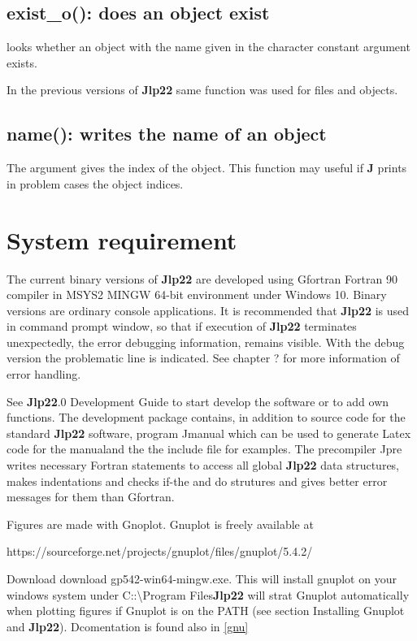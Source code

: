 \subsection{\textcolor{VioletRed}{exist\_o}(): does an object exist}
\label{existo}
looks whether an object with the name given in
the character constant  argument exists.
\begin{note}
In the previous versions of \textbf{Jlp22} same function was used for files and objects.
\end{note}
\subsection{\textcolor{VioletRed}{name}(): writes the name of an object}
\label{name}
The argument gives the index of the object. This function
may useful if \textbf{J} prints in problem cases the object indices.
\section{System requirement}
\label{system}
The current binary versions of \textbf{Jlp22} are developed using Gfortran Fortran 90 compiler in MSYS2 MINGW 64-bit environment
under Windows 10.
Binary versions are ordinary console applications. It is recommended that \textbf{Jlp22} is used in command
prompt window, so that
if execution of \textbf{Jlp22} terminates unexpectedly, the error debugging information, remains visible.
With the debug version the problematic line is indicated.
See chapter ? for more information of error handling.

See \textbf{Jlp22}.0 Development Guide to start develop the software or to add
own functions. The development package contains, in addition to source code for
the standard \textbf{Jlp22} software, program Jmanual
which can be used to generate Latex code for the manualand the the include file for
examples.   The precompiler Jpre  writes necessary Fortran statements to access all global
\textbf{Jlp22} data structures, makes indentations and checks if-the and do strutures and gives
better error messages for them than Gfortran.

Figures are made with Gnoplot.
Gnuplot is freely available at


https://sourceforge.net/projects/gnuplot/files/gnuplot/5.4.2/

Download  download gp542-win64-mingw.exe. This will install gnuplot on your windows
system under C::\textbackslash Program Files\gnuplot\. \textbf{Jlp22} will strat Gnuplot automatically when
plotting figures if Gnuplot is on the PATH (see section Installing Gnuplot and \textbf{Jlp22}).
Dcomentation is found also in \ref{gnu}


